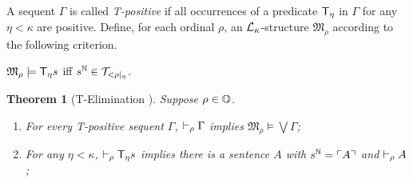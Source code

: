 \documentclass[UKenglish,cleveref,DIV=12]{scrartcl}
\newtheorem{theorem}{Theorem}[section]
\theoremstyle{definition}
\theoremstyle{definition}
\begin{document}
A sequent $\Gamma$ is called \emph{T-positive} if all occurrences of a predicate $\mathsf{T}_\eta$ in $\Gamma$ for any $\eta<\kappa$ are positive. Define, for each ordinal $\rho$, an $\mathcal{L}_\kappa$-structure $\mathfrak{M}_\rho$ according to the following criterion.
\begin{center}
 $\mathfrak{M}_\rho\models \mathsf{T}_\eta s$ iff $s^\mathbb N\in\mathcal{T}_{<\rho|_\eta}$.
\end{center}
\begin{theorem}[T-Elimination ]\label{lem:FFTElim}\label{thm:FFTElim} Suppose $\rho\in\mathbb{O}$.
\begin{enumerate}
  \item For every T-positive sequent $\Gamma$, $\vdash_\rho \Gamma$ implies
	$\mathfrak{M}_\rho\models\bigvee\Gamma$;
  \item For any $\eta<\kappa$, $\vdash_\rho  \mathsf{T}_\eta s$ implies there is a
	sentence $A$ with $s^\mathbb N=\ulcorner{A}\urcorner$ and $\vdash_\rho  A$;
\end{enumerate}
\end{theorem}
\end{document}
